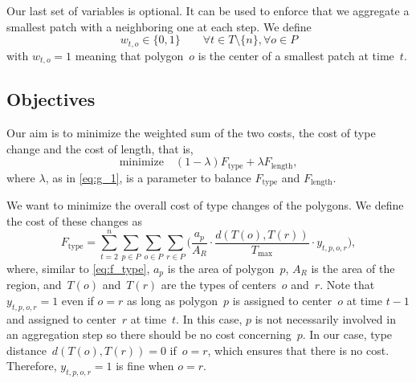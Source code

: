Our last set of variables is optional.  It can be used to enforce that 
we aggregate a smallest patch with a neighboring one at each step. 
We define 
$$
w_{t,o}\in \{0,1\} \qquad 
\forall t\in T\setminus\{n\}, \forall o \in P 
$$
with $w_{t,o}=1$ meaning 
that polygon~$o$ is the center of 
a smallest patch at time~$t$.


\subsection{Objectives}
\label{sub:objectives}

Our aim is to minimize the weighted sum of the two costs, 
the cost of type change and the cost of length,
that is,
\begin{equation}
\label{eq:ilpcost}
\mathrm{minimize} \quad 
(1-\lambda)F_\mathrm{type} +\lambda F_\mathrm{length},
\nonumber
\end{equation}
where $\lambda$, as in \eq\ref{eq:g_1}, 
is a parameter to balance 
$F_\mathrm{type}$ and $F_\mathrm{length}$.

We want to minimize the overall cost of type changes of the 
polygons. 
We define the cost of these changes as
\begin{equation}
\label{eq:F_type}
F_\mathrm{type}=\sum_{t=2}^{n} \sum_{p\in P} \sum_{o\in P} 
\sum_{r\in P}
\bigg( \frac{a_p}{A_R} \cdot
\frac{d(T(o),T(r))}{T_{\max}}\cdot 
y_{t,p,o,r}\bigg),
\end{equation}
where, similar to \eq\ref{eq:f_type}, 
$a_p$ is the area of polygon~$p$,
$A_R$ is the area of the region, 
and~$T(o)$ and~$T(r)$ are the types of centers~$o$ and~$r$.
Note that~$y_{t,p,o,r}=1$ even if $o=r$
as long as polygon~$p$ is assigned to center~$o$ at time $t-1$
and assigned to center~$r$ at time~$t$.
In this case, $p$ is not necessarily involved in an aggregation 
step so there should be no cost concerning~$p$.
In our case, type distance~$d(T(o),T(r))=0$ if~$o=r$,
which ensures that there is no cost.
Therefore, $y_{t,p,o,r}=1$ is fine when $o=r$. 


